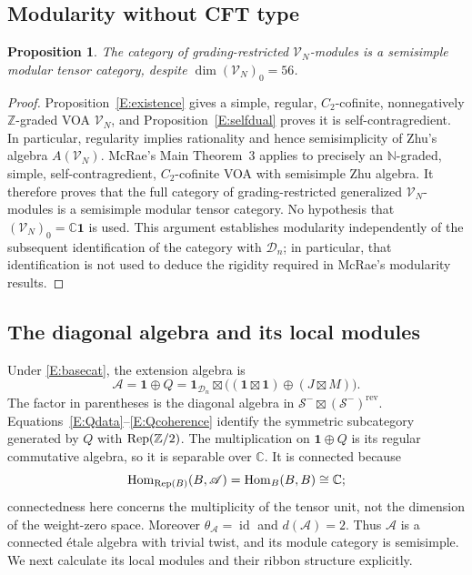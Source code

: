 \documentclass[11pt]{article}
\newtheorem{proposition}[theorem]{Proposition}
\newcommand{\C}{\mathbb C}\newcommand{\Q}{\mathbb Q}\newcommand{\Z}{\mathbb Z}
\newcommand{\one}{\mathbf1}\newcommand{\D}{\mathcal D}\newcommand{\Dcat}{\mathcal D}
\newcommand{\Scat}{\mathcal S}\newcommand{\U}{\mathcal U}\newcommand{\bo}{\boxtimes}
\newcommand{\Hom}{\operatorname{Hom}}\newcommand{\id}{\operatorname{id}}
\numberwithin{equation}{section}
\begin{document}
\subsection{Modularity without CFT type}\label{E:nonCFTsection}
\begin{proposition}\label{E:nonCFTmodular}
The category of grading-restricted $\mathscr{V}_N$-modules is a semisimple modular
tensor category, despite $\dim (\mathscr{V}_N)_0=56$.
\end{proposition}
\begin{proof}
Proposition~\ref{E:existence} gives a simple, regular, $C_2$-cofinite,
nonnegatively $\Z$-graded VOA $\mathscr{V}_N$, and
Proposition~\ref{E:selfdual} proves it is self-contragredient. In particular,
regularity implies rationality and hence semisimplicity of Zhu's algebra
$A(\mathscr{V}_N)$. McRae's Main Theorem~3 \cite{A:McR} applies to precisely an
$\mathbb N$-graded, simple, self-contragredient, $C_2$-cofinite VOA with semisimple
Zhu algebra. It therefore proves that the full category of
grading-restricted generalized $\mathscr{V}_N$-modules is a semisimple modular
tensor category. No hypothesis that $(\mathscr{V}_N)_0=\C\one$ is used. This argument
establishes modularity independently of the subsequent identification of
the category with $\D_n$; in particular, that identification is not used
to deduce the rigidity required in McRae's modularity results.
\end{proof}

\subsection{The diagonal algebra and its local modules}\label{E:localmodules}
Under \eqref{E:basecat}, the extension algebra is
\begin{equation}\label{E:diagonal}
\mathscr A=\one\oplus Q
=\one_{\D_n}\bo\bigl((\one\bo\one)\oplus(J\bo M)\bigr).
\end{equation}
The factor in parentheses is the diagonal algebra in $\Scat^-\bo(\Scat^-)^{\mathrm{rev}}$. Equations~\eqref{E:Qdata}--\eqref{E:Qcoherence} identify the symmetric subcategory generated by $Q$ with $\Rep(\Z/2)$. The multiplication on $\one\oplus Q$ is its regular commutative algebra, so it is separable over $\C$. It is connected because
\[
\Hom_{\Rep(B)}(B,\mathscr A)=\Hom_B(B,B)\cong\C;
\]
connectedness here concerns the multiplicity of the tensor unit, not the dimension of the weight-zero space. Moreover $\theta_{\mathscr A}=\id$ and $d(\mathscr A)=2$. Thus $\mathscr A$ is a connected \'etale algebra with trivial twist, and its module category is semisimple. We next calculate its local modules and their ribbon structure explicitly.
\end{document}
